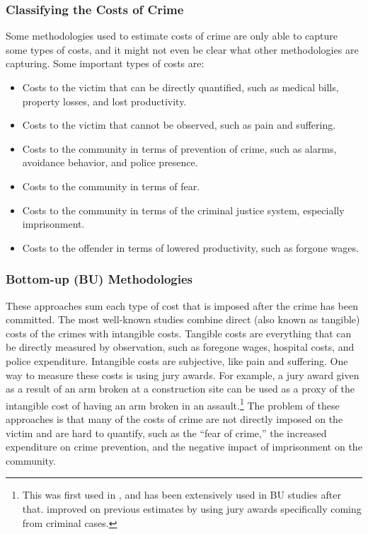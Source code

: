 \subsubsection{Classifying the Costs of Crime}
\noindent Some methodologies used to estimate costs of crime are only able to capture some types of costs, and it might not even be clear what other methodologies are capturing. Some important types of costs are: \\
\begin{itemize}
\item Costs to the victim that can be directly quantified, such as medical bills, property losses, and lost productivity.
\item Costs to the victim that cannot be observed, such as pain and suffering.
\item Costs to the community in terms of prevention of crime, such as alarms, avoidance behavior, and police presence.
\item Costs to the community in terms of fear.
\item Costs to the community in terms of the criminal justice system, especially imprisonment.
\item Costs to the offender in terms of lowered productivity, such as forgone wages.
\end{itemize}

\subsubsection{Bottom-up (BU) Methodologies}
\noindent These approaches sum each type of cost that is imposed after the crime has been committed. The most well-known studies combine direct (also known as tangible) costs of the crimes with intangible costs. Tangible costs are everything that can be directly measured by observation, such as foregone wages, hospital costs, and police expenditure. Intangible costs are subjective, like pain and suffering. One way to measure these costs is using jury awards. For example, a jury award given as a result of an arm broken at a construction site can be used as a proxy of the intangible cost of having an arm broken in an assault.\footnote{This was first used in \citet{cohen_1988_Pain-Suffering}, and has been extensively used in BU studies after that. \citet{Miller_Cohen_ea_1996_BOOKvictim} improved on previous estimates by using jury awards specifically coming from criminal cases.} The problem of these approaches is that many of the costs of crime are not directly imposed on the victim and are hard to quantify, such as the ``fear of crime,'' the increased expenditure on crime prevention, and the negative impact of imprisonment on the community. \\

